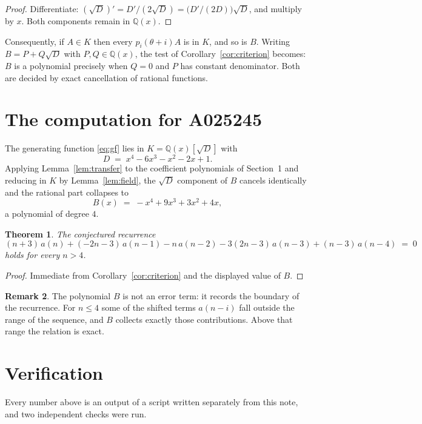 \documentclass[11pt,a4paper]{article}
\theoremstyle{plain}
\newtheorem{theorem}{Theorem}
\theoremstyle{definition}
\newtheorem{remark}[theorem]{Remark}
\begin{document}
\begin{proof}
Differentiate: $(\sqrt{D})'=D'/(2\sqrt{D})=\bigl(D'/(2D)\bigr)\sqrt{D}$, and multiply by
$x$. Both components remain in $\mathbb{Q}(x)$.
\end{proof}

Consequently, if $A\in K$ then every $p_{i}(\theta+i)A$ is in $K$, and so is $B$. Writing
$B=P+Q\sqrt{D}$ with $P,Q\in\mathbb{Q}(x)$, the test of Corollary~\ref{cor:criterion}
becomes: $B$ is a polynomial precisely when $Q=0$ and $P$ has constant denominator. Both
are decided by exact cancellation of rational functions.

\section{The computation for A025245}

The generating function \eqref{eq:gf} lies in $K=\mathbb{Q}(x)[\sqrt{D}]$ with
\[
D \;=\; x^{4} - 6 x^{3} - x^{2} - 2 x + 1 .
\]
Applying Lemma~\ref{lem:transfer} to the coefficient polynomials of Section~1 and reducing
in $K$ by Lemma~\ref{lem:field}, the $\sqrt{D}$ component of $B$ cancels identically and
the rational part collapses to
\[
B(x)\;=\;- x^{4} + 9 x^{3} + 3 x^{2} + 4 x ,
\]
a polynomial of degree $4$.

\begin{theorem}
The conjectured recurrence
\[
(n + 3)\,a(n) + (- 2 n - 3)\,a(n-1) -  n\,a(n-2) -  3 \left(2 n - 3\right)\,a(n-3) + (n - 3)\,a(n-4) \;=\;0
\]
holds for every $n>4$.
\end{theorem}

\begin{proof}
Immediate from Corollary~\ref{cor:criterion} and the displayed value of $B$.
\end{proof}

\begin{remark}
The polynomial $B$ is not an error term: it records the boundary of the recurrence. For
$n\le4$ some of the shifted terms $a(n-i)$ fall outside the range of the sequence,
and $B$ collects exactly those contributions. Above that range the relation is exact.
\end{remark}

\section{Verification}

Every number above is an output of a script written separately from this note, and two
independent checks were run.
\end{document}
